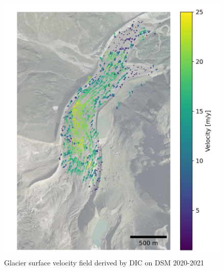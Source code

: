 \begin{figure}
    \centering
    \includegraphics[height=\textheight]{figures/chapter3/velocity_DIC_2020-2021.png}
    \caption{Glacier surface velocity field derived by DIC on DSM 2020-2021}
\end{figure}

